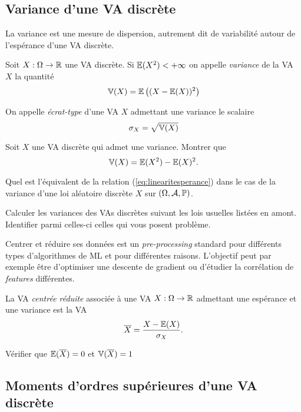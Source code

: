 \documentclass[11pt, a4paper]{article}
\begin{document}
\subsection{Variance d'une VA discrète}
\label{sec:varianceVAdiscrete}

La variance est une mesure de dispersion, autrement dit de variabilité
autour de l'espérance d'une VA discrète.
\begin{defn}
  Soit $X : \Omega \to \mathbb{R}$ une VA discrète. Si $\operatorname{\mathbb{E}}(X^2) < + \infty$
  on appelle \emph{variance} de la VA $X$ la quantité
  \[
    \operatorname{\mathbb{V}}(X) = \operatorname{\mathbb{E}}\big( (X- \operatorname{\mathbb{E}}(X))^2\big)
  \]
\end{defn}
On appelle \emph{écrat-type} d'une VA $X$ admettant une variance le
scalaire
\[
  \sigma_X = \sqrt{\operatorname{\mathbb{V}}(X)}
\]
\begin{question}
  Soit $X$ une VA discrète qui admet une variance. Montrer que
  \[
    \operatorname{\mathbb{V}}(X) = \operatorname{\mathbb{E}}(X^2) - \operatorname{\mathbb{E}}(X)^2.
  \]
\end{question}
\begin{question}
  Quel est l'équivalent de la relation (\ref{eq:linearitesperance})
  dans le cas de la variance d'une loi aléatoire discrète $X$ sur
  $(\Omega, \mathcal{A}, \operatorname{\mathbb{P}})$.
\end{question}
\begin{question}
  Calculer les variances des VAs discrètes suivant les lois usuelles
  listées en amont. Identifier parmi celles-ci celles qui vous posent
  problème.
\end{question}
Centrer et réduire ses données est un \textit{pre-processing} standard
pour différents types d'algorithmes de ML et pour différentes
raisons. L'objectif peut par exemple être d'optimiser une descente de
gradient ou d'étudier la corrélation de \textit{features} différentes.
\begin{defn}
  La VA \emph{centrée réduite} associée à une VA $X : \Omega \to \mathbb{R}$
  admettant une espérance et une variance est la VA
  \[
    \overline{X} = \frac{X - \operatorname{\mathbb{E}}(X)}{\sigma_X}.
  \]
\end{defn}
\begin{question}
  Vérifier que $\operatorname{\mathbb{E}}(\overline{X}) = 0$ et $\operatorname{\mathbb{V}}(\overline{X}) = 1$
\end{question}

\subsection{Moments d'ordres supérieures d'une VA discrète}
\label{sec:momentsups}
\end{document}
